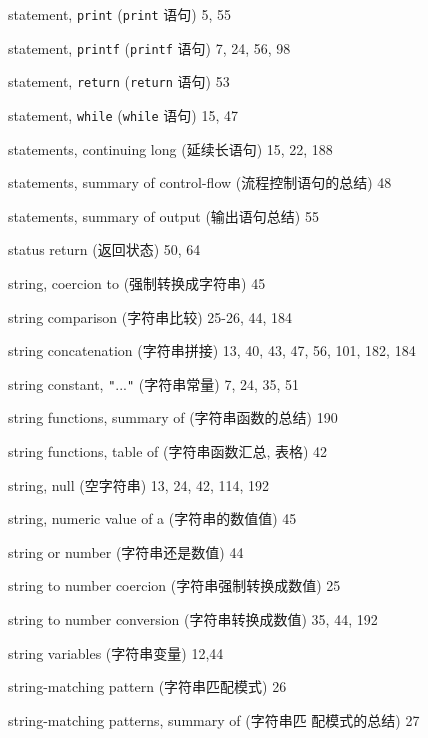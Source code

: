 \begin{multicols}{2}
\hangindent=2pc  statement, \verb'print' (\verb'print' 语句) 5, 55

\hangindent=2pc  statement, \verb'printf' (\verb'printf' 语句)
7, 24, 56, 98

\hangindent=2pc  statement, \verb'return' (\verb'return' 语句) 53

\hangindent=2pc  statement, \verb'while' (\verb'while' 语句) 15, 47

\hangindent=2pc  statements, continuing long (延续长语句) 15, 22, 188

\hangindent=2pc  statements, summary of control-flow
(流程控制语句的总结) 48

\hangindent=2pc  statements, summary of output (输出语句总结) 55

\hangindent=2pc  status return (返回状态) 50, 64

\hangindent=2pc  string, coercion to (强制转换成字符串) 45

\hangindent=2pc  string comparison (字符串比较) 25-26, 44, 184

\hangindent=2pc  string concatenation (字符串拼接)
13, 40, 43,  47, 56, 101, 182, 184

\hangindent=2pc  string constant, \verb'"'...\verb'"' (字符串常量)
7, 24, 35, 51

\hangindent=2pc  string functions, summary of (字符串函数的总结) 190

\hangindent=2pc  string functions, table of (字符串函数汇总,
表格) 42

\hangindent=2pc  string, null (空字符串) 13, 24, 42, 114, 192

\hangindent=2pc  string, numeric value of a (字符串的数值值) 45

\hangindent=2pc  string or number (字符串还是数值) 44

\hangindent=2pc  string to number coercion (字符串强制转换成数值) 25

\hangindent=2pc  string to number conversion (字符串转换成数值)
35, 44, 192

\hangindent=2pc  string variables (字符串变量) 12,44

\hangindent=2pc  string-matching pattern (字符串匹配模式) 26

\hangindent=2pc  string-matching patterns, summary of (字符串匹 
配模式的总结) 27


\end{multicols}
